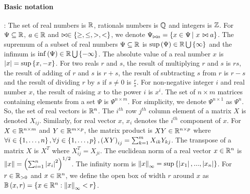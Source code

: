 \paragraph{Basic notation}:  The set of real numbers is $\mathbb{R}$, rationals numbers is $\mathbb{Q}$
and integers is $\mathbb{Z}$.  For $\Psi\subseteq\mathbb{R}$, $a\in\mathbb{R}$
and $\bowtie\in\left\{\geq,\leq,>,<\right\}$, we denote $\Psi_{\bowtie a}
= \left\{ x\in\Psi \left|~x\right. \bowtie a \right\}$.  The supremum of a subset of real
numbers $\Psi\subseteq\mathbb{R}$ is
$\sup\left(\Psi\right)\in\mathbb{R}\bigcup\left\{\infty\right\}$ and the infimum is
$\inf\left(\Psi\right)\in\mathbb{R}\bigcup\left\{-\infty\right\}$.  The absolute value of a
real number $x$ is $\left|x\right| = \sup\left\{x,-x\right\}$.  For two reals $r$ and
$s$, the result of multiplying $r$ and $s$ is $rs$, the result of
adding of $r$ and $s$ is $r+s$, the result of subtracting $s$ from $r$
is $r-s$ and the result of dividing $r$ by $s$ if $s\neq 0$ is
$\frac{r}{s}$.  For non-negative integer $i$ and real number $x$, the
result of raising $x$ to the power $i$ is $x^i$.  The set of $n\times
m$ matrices containing elements from a set $\Psi$ is $\Psi^{n\times
m}$.  For simplicity, we denote $\Psi^{n\times 1}$ as $\Psi^n$.  So,
the set of real vectors is $\mathbb{R}^n$. The $i^{th}$ row $j^{th}$
column element of a matrix $X$ is denoted $X_{ij}$.  Similarly, for
real vector $x$, $x_i$ denotes the $i^{th}$ component of $x$.  For
$X\in\mathbb{R}^{n\times m}$ and $Y\in\mathbb{R}^{m\times p}$, the matrix
product is $XY\in\mathbb{R}^{n\times p}$ where $\forall
i\in\left\{1,\ldots,n\right\},\forall j\in\left\{1,\ldots,p\right\},\left(XY\right)_{ij}
= \sum_{k=1}^{m}X_{ik}Y_{kj}$.  The transpose of a matrix $X$ is $X^T$
where $X^T_{ij} = X_{ji}$.  The euclidean norm of a real vector
$x\in\mathbb{R}^n$ is $\left\|x\right\| = \left(\sum_{i=1}^n\left|x_i\right|^2\right)^{1/2}$.
The infinity norm is $\left\|x\right\|_\infty
= \sup\left\{\left|x_1\right|,...,\left|x_n\right|\right\}$.  For $r\in\mathbb{R}_{> 0}$ and
$x\in\mathbb{R}^n$, we define the open box of width $r$ around $x$ as
$\mathbb{B}\left(x,r\right) = \left\{ x\in\mathbb{R}^n: \left\|x\right\|_\infty < r \right\}$.

